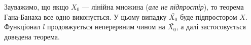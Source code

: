 \documentclass{math_library}
\begin{document}
\begin{remark}
Зауважимо, що якщо $X_0$ --- лінійна множина (\textit{але не підпростір}), то теорема Гана-Банаха все одно виконується. У цьому випадку $\bar{X_0}$ буде підпростором $X$. Функціонал $l$ продовжується неперервним чином на $\bar{X_0}$, а далі застосовується доведена теорема.
\end{remark}

\end{document}
